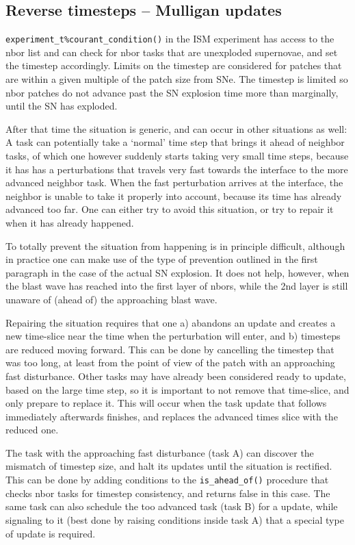 \documentclass[paper=a4,fontsize=11pt]{scrartcl}
\numberwithin{equation}{section}		%
\numberwithin{figure}{section}			%
\numberwithin{table}{section}				%
\newcommand{\codecolor}{\color{Blue}}
\newcommand{\Code}[1]{{\codecolor\texttt{#1}}}
\def\isaheadof{\Code{is\_ahead\_of()}}
\begin{document}
\subsection{Reverse timesteps -- Mulligan updates}
\Code{experiment\_t\%courant\_condition()} in the ISM experiment has access to the nbor list and can check for nbor tasks that are unexploded supernovae, and set the timestep accordingly.  Limits on the timestep are considered for patches that are within a given multiple of the patch size from SNe.  The timestep is limited so nbor patches do not advance past the SN explosion time more than marginally, until the SN has exploded.

After that time the situation is generic, and can occur in other situations as well:  A task can potentially take a `normal' time step that brings it ahead of neighbor tasks, of which one however suddenly starts taking very small time steps, because it has has a perturbations that travels very fast towards the interface to the more advanced neighbor task.  When the fast perturbation arrives at the interface, the neighbor is unable to take it properly into account, because its time has already advanced too far.  One can either try to avoid this situation, or try to repair it when it has already happened.

To totally prevent the situation from happening is in principle difficult, although in practice one can make use of the type of prevention outlined in the first paragraph in the case of the actual SN explosion.  It does not help, however, when the blast wave has reached into the first layer of nbors, while the 2nd layer is still unaware of (ahead of) the approaching blast wave.

Repairing the situation requires that one a) abandons an update and creates a new time-slice near the time when the perturbation will enter, and b) timesteps are reduced moving forward.  This can be done by cancelling the timestep that was too long, at least from the point of view of the patch with an approaching fast disturbance.   Other tasks may have already been considered ready to update, based on the large time step, so it is important to not remove that time-slice, and only prepare to replace it.  This will occur when the task update that follows immediately afterwards finishes, and replaces the advanced times slice with the reduced one.   

The task with the approaching fast disturbance (task A) can discover the mismatch of timestep size, and halt its updates until the situation is rectified.  This can be done by adding conditions to the \isaheadof{} procedure that checks nbor tasks for timestep consistency, and returns false in this case.  The same task can also schedule the too advanced task (task B) for a update, while signaling to it (best done by raising conditions inside task A) that a special type of update is required.
\end{document}
